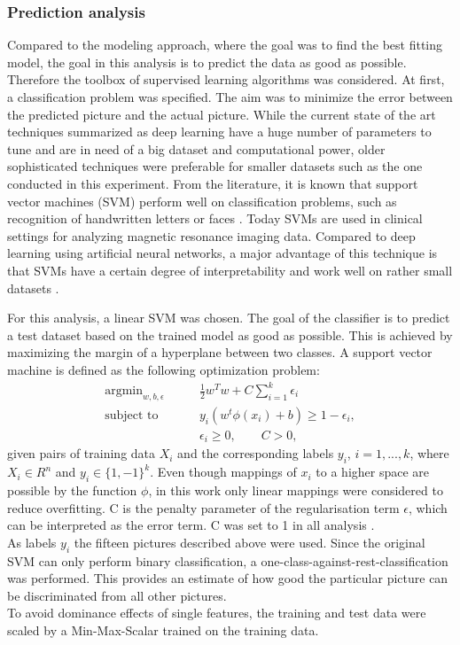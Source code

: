 \documentclass[a4paper,man,natbib,floatsintext]{apa6}
\begin{document}
\subsubsection{Prediction analysis}
Compared to the modeling approach, where the goal was to find the best fitting model, the goal in this analysis is to predict the data as good as possible. Therefore the toolbox of supervised learning algorithms was considered. At first, a classification problem was specified. The aim was to minimize the error between the predicted picture and the actual picture.  While the current state of the art techniques summarized as deep learning have a huge number of parameters to tune and are in need of a big dataset and computational power, older sophisticated techniques were preferable for smaller datasets such as the one conducted in this experiment. From the literature, it is known that support vector machines (SVM) perform well on classification problems, such as recognition of handwritten letters or faces \citep{Bahlmann2002,Guo2001}. Today SVMs are used in clinical settings for analyzing magnetic resonance imaging data. Compared to deep learning using artificial neural networks, a major advantage of this technique is that SVMs have a certain degree of interpretability and work well on rather small datasets \citep{Segovia2010}.


For this analysis, a linear SVM was chosen.  The goal of the classifier is to predict a test dataset based on the trained model as good as possible. This is achieved by maximizing the margin of a hyperplane between two classes. A support vector machine is defined as the following optimization problem: 
\begin{align}
\text{argmin}_{w,b,\epsilon} &\qquad \frac{1}{2} w^Tw + C\sum^k_{i=1} \epsilon_i \\
\text{subject to }&\qquad   y_i(w^t\phi(x_i)+b) \geq 1-\epsilon_i, \\ & \qquad \epsilon_i \geq 0, \qquad C>0,
\end{align}
given pairs of training data $X_i$ and the corresponding labels $y_i$, $i=1,...,k$, where $X_i \in R^n$ and $y_i \in \{1,-1\}^k$. Even though mappings of $x_i$ to a higher space are possible by the function $\phi$, in this work only linear mappings were considered to reduce overfitting. C is the penalty parameter of the regularisation term $\epsilon$, which can be interpreted as the error term. C was set to 1 in all analysis \citep{Cortes1995}. \\
As labels $y_i$ the fifteen pictures described above were used. Since the original SVM can only perform binary classification, a one-class-against-rest-classification was performed. This provides an estimate of how good the particular picture can be discriminated from all other pictures.\\ %
To avoid dominance effects of single features, the training and test data were scaled by a Min-Max-Scalar trained on the training data.\\
\end{document}
